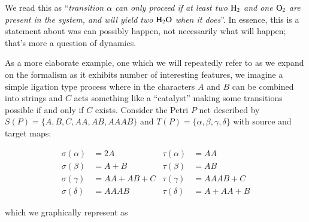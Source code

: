\documentclass[aps,prd,onecolumn,nofootinbib,letterpaper,preprintnumbers,superscriptaddress,eqsecnum]{revtex4}
\theoremstyle{definition}
\newcommand{\red}[1]{{\color{red}#1}}
\begin{document}
We read this as ``\textit{transition $\alpha$ can only proceed if at least two $\ce{H_2}$ and one $\ce{O_2}$ are present in the system, and will yield two $\ce{H_2O}$ when it does}''.
In essence, this is a statement about was can possibly happen, not necessarily what will happen; that's more a question of dynamics.

As a more elaborate example, one which we will repeatedly refer to as we expand on the formalism as it exhibits number of interesting features, we imagine a simple ligation type process where in the characters $A$ and $B$ can be combined into strings and $C$ acts something like a \red{``catalyst''} making some transitions possible if and only if $C$ exists.
Consider the Petri $P$ net described by $S(P) = \{ A, B, C, AA, AB, AAAB \}$ and $T(P) = \{ \alpha, \beta, \gamma, \delta \}$ with source and target maps:

\begin{align*}
    \sigma(\alpha) &= 2A           & \tau(\alpha) &= AA         \\
    \sigma(\beta)  &= A + B        & \tau(\beta)  &= AB         \\
    \sigma(\gamma) &= AA + AB + C  & \tau(\gamma) &= AAAB + C   \\
    \sigma(\delta) &= AAAB         & \tau(\delta) &= A + AA + B
\end{align*}

which we graphically represent as
\end{document}
